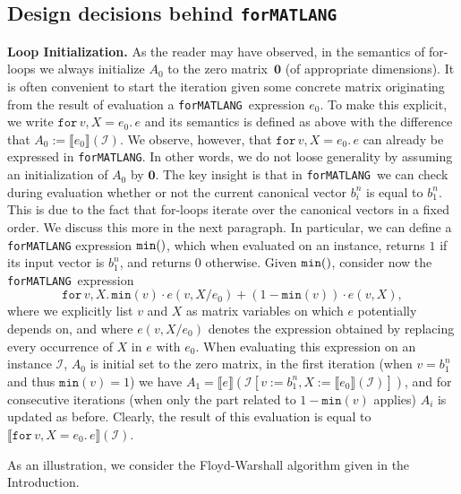 \documentclass[sigconf]{acmart}
\newcommand{\sem}[2]{\llbracket #1 \rrbracket(#2)}
\newcommand{\I}{\mathcal{I}}
\newcommand{\langfor}{\texttt{for}\text{-}\texttt{MATLANG}\xspace}
\newcommand{\ffor}[3]{\texttt{for}\, #1,#2 \texttt{.}\, #3}
\newcommand{\initf}[4]{\texttt{for}\, #2,#3\!=\! #1 \texttt{.}\, #4}
\newcommand{\mmin}[1]{\texttt{min}(#1)}
\begin{document}
\subsection{Design decisions behind \langfor}
\noindent\textbf{Loop Initialization.} As the reader may have observed, in the semantics of for-loops we 
always initialize $A_0$ to the zero matrix~$\mathbf{0}$ (of appropriate dimensions). It is often convenient
to start the iteration given some concrete matrix  originating from the result of evaluation a \langfor\ expression $e_0$. To make this explicit, we write $\initf{e_0}{v}{X}{e}$ and its semantics is defined as above
with the difference that $A_0:=\sem{e_0}{\I}$. We observe, however, that $\initf{e_0}{v}{X}{e}$ can already
be expressed in \langfor. In other words, we do not loose generality by assuming an initialization of $A_0$ by $\mathbf{0}$.
The key insight is that in \langfor\ we can check during evaluation whether or not
the current canonical vector $b_i^n$ is equal to $b_1^n$. This 
is due to the fact that for-loops iterate over the canonical vectors in a fixed order. We discuss this more in the next paragraph.
In particular, we can define a \langfor expression $\mmin$, which when evaluated on an instance, returns $1$ if its input vector is $b_1^n$, and returns $0$ otherwise. Given $\mmin$, consider now the
\langfor\ expression
 $$\ffor{v}{X}{\mmin{v}\cdot e(v,X/e_0) + (1-\mmin{v})\cdot e(v,X)},$$
 where we explicitly list $v$ and $X$ as matrix variables on which $e$ potentially depends on, and where
 $e(v,X/e_0)$ denotes the expression obtained by replacing every occurrence of $X$ in $e$ with $e_0$.
When evaluating this expression on an instance $\I$, $A_0$ is initial set to the zero matrix, in the first iteration (when  $v=b_1^n$ and thus $\mmin{v}=1$)
we have $A_1=\sem{e}{\I[v:=b_1^n,X:=\sem{e_0}{\I}]}$, and for consecutive iterations (when only the part related to $1-\mmin{v}$ applies) $A_i$ is updated as before. Clearly, the result of this evaluation is equal to
$\sem{\initf{e_0}{v}{X}{e}}{\I}$. 


As an illustration, we consider the Floyd-Warshall algorithm given in the Introduction. 
\end{document}
